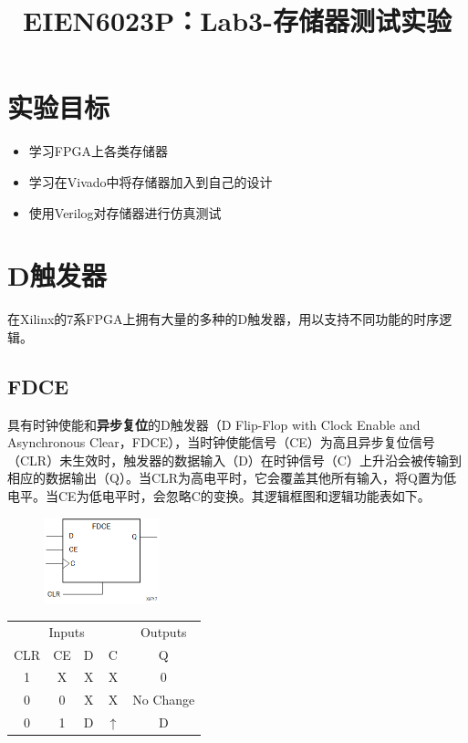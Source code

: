 \documentclass{ctexart}
\title{EIEN6023P：Lab3-存储器测试实验}
\author{}
\date{}
\begin{document}
\maketitle

\section{实验目标}
\begin{itemize}
    \item 学习FPGA上各类存储器
    \item 学习在Vivado中将存储器加入到自己的设计
    \item 使用Verilog对存储器进行仿真测试
\end{itemize}


\section{D触发器}

在Xilinx的7系FPGA上拥有大量的多种的D触发器，用以支持不同功能的时序逻辑。

\subsection{FDCE}

具有时钟使能和\textbf{异步复位}的D触发器（D Flip-Flop with Clock Enable and Asynchronous Clear，FDCE），当时钟使能信号（CE）为高且异步复位信号（CLR）未生效时，触发器的数据输入（D）在时钟信号（C）上升沿会被传输到相应的数据输出（Q）。当CLR为高电平时，它会覆盖其他所有输入，将Q置为低电平。当CE为低电平时，会忽略C的变换。其逻辑框图和逻辑功能表如下。

\begin{figure}[H]
    \centering
    \includegraphics[width=0.3\textwidth]{lab3/1.png}
\end{figure}

\begin{table}[H]
    \centering
    \begin{tabular}{ c c c c c }
        \hline
        \multicolumn{4}{c}{Inputs} & \multicolumn{1}{c}{Outputs} \\
        \cmidrule(r){1-4} \cmidrule(r){5-5}
        CLR & CE & D & C & Q \\
        \hline
        1 & X & X & X & 0 \\
        0 & 0 & X & X & No Change \\
        0 & 1 & D & $\uparrow$ & D \\
        \hline
    \end{tabular}
\end{table}
\end{document}
